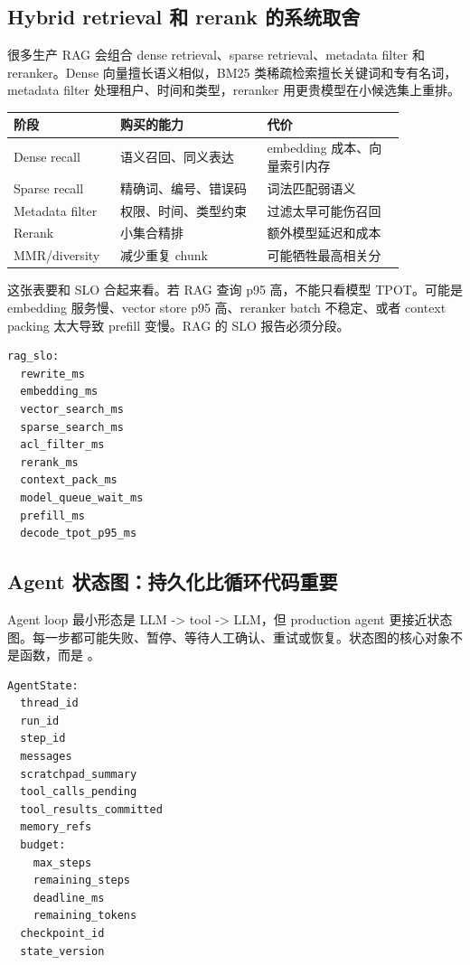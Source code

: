 \subsection{Hybrid retrieval 和 rerank 的系统取舍}

很多生产 RAG 会组合 dense retrieval、sparse retrieval、metadata filter 和 reranker。Dense 向量擅长语义相似，BM25 类稀疏检索擅长关键词和专有名词，metadata filter 处理租户、时间和类型，reranker 用更贵模型在小候选集上重排。

\begin{center}
\small
\begin{tabular}{p{0.20\linewidth}p{0.34\linewidth}p{0.32\linewidth}}
\toprule
阶段 & 购买的能力 & 代价 \\
\midrule
Dense recall & 语义召回、同义表达 & embedding 成本、向量索引内存 \\
Sparse recall & 精确词、编号、错误码 & 词法匹配弱语义 \\
Metadata filter & 权限、时间、类型约束 & 过滤太早可能伤召回 \\
Rerank & 小集合精排 & 额外模型延迟和成本 \\
MMR/diversity & 减少重复 chunk & 可能牺牲最高相关分 \\
\bottomrule
\end{tabular}
\end{center}

这张表要和 SLO 合起来看。若 RAG 查询 p95 高，不能只看模型 TPOT。可能是 embedding 服务慢、vector store p95 高、reranker batch 不稳定、或者 context packing 太大导致 prefill 变慢。RAG 的 SLO 报告必须分段。

\begin{lstlisting}[numbers=none,caption={RAG SLO 分段}]
rag_slo:
  rewrite_ms
  embedding_ms
  vector_search_ms
  sparse_search_ms
  acl_filter_ms
  rerank_ms
  context_pack_ms
  model_queue_wait_ms
  prefill_ms
  decode_tpot_p95_ms
\end{lstlisting}

\subsection{Agent 状态图：持久化比循环代码重要}

Agent loop 最小形态是 LLM -> tool -> LLM，但 production agent 更接近状态图。每一步都可能失败、暂停、等待人工确认、重试或恢复。状态图的核心对象不是函数，而是 。

\begin{lstlisting}[numbers=none,caption={AgentState 最小字段}]
AgentState:
  thread_id
  run_id
  step_id
  messages
  scratchpad_summary
  tool_calls_pending
  tool_results_committed
  memory_refs
  budget:
    max_steps
    remaining_steps
    deadline_ms
    remaining_tokens
  checkpoint_id
  state_version
\end{lstlisting}

